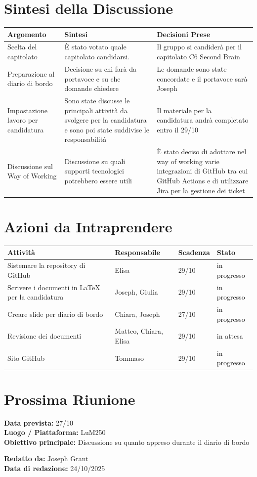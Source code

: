 \documentclass[a4paper,12pt]{article}
\begin{document}
\section*{ Sintesi della Discussione}

\begin{longtable}{|p{}|p{}|p{}|}
\hline
\textbf{Argomento} & \textbf{Sintesi} & \textbf{Decisioni Prese} \\ \hline
 Scelta del capitolato&È stato votato quale capitolato candidarsi.  & Il gruppo si candiderà per il capitolato C6 Second Brain  \\ \hline
 Preparazione al diario di bordo&Decisione su chi farà da portavoce e su che domande chiedere  &Le domande sono state concordate e il portavoce sarà Joseph   \\ \hline
 Impostazione lavoro per candidatura&Sono state discusse le principali attività da svolgere per la candidatura e sono poi state suddivise le responsabilità  &Il materiale per la candidatura andrà completato entro il 29/10  \\ \hline
 Discussione sul Way of Working&Discussione su quali supporti tecnologici potrebbero essere utili  &È stato deciso di adottare nel way of working varie integrazioni di GitHub tra cui GitHub Actions e di utilizzare Jira per la gestione dei ticket \\ \hline
\end{longtable}


\section*{ Azioni da Intraprendere}

\begin{longtable}{|p{}|p{}|p{}|p{}|}
\hline
\textbf{Attività} & \textbf{Responsabile} & \textbf{Scadenza} & \textbf{Stato} \\ \hline
 Sistemare la repository di GitHub&Elisa  &29/10  &in progresso  \\ \hline
 Scrivere i documenti in LaTeX per la candidatura&Joseph, Giulia  &29/10  &in progresso  \\ \hline
 Creare slide per diario di bordo&Chiara, Joseph&27/10  &in progresso  \\ \hline
 Revisione dei documenti&Matteo, Chiara, Elisa  &29/10  &in attesa   \\ \hline
 Sito GitHub &Tommaso&29/10  &in progresso   \\ \hline
\end{longtable}


\section*{ Prossima Riunione}
\textbf{Data prevista:} 27/10 \\
\textbf{Luogo / Piattaforma:} LuM250 \\
\textbf{Obiettivo principale:} Discussione su quanto appreso durante il diario di bordo


\textbf{Redatto da:} Joseph Grant \\
\textbf{Data di redazione:} 24/10/2025
\end{document}
